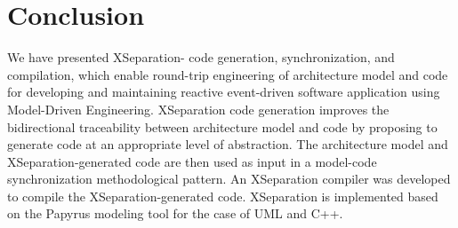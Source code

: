 \section{Conclusion}
\label{sec:conclusion}
We have presented XSeparation- code generation, synchronization, and compilation, which enable round-trip engineering of architecture model and code for developing and maintaining reactive event-driven software application using Model-Driven Engineering.
XSeparation code generation improves the bidirectional traceability between architecture model and code by proposing to generate code at an appropriate level of abstraction. 
The architecture model and XSeparation-generated code are then used as input in a model-code synchronization methodological pattern.
An XSeparation compiler was developed to compile the XSeparation-generated code.
XSeparation is implemented based on the Papyrus modeling tool for the case of UML and C++. 
 
\lipsum[1-2] 




